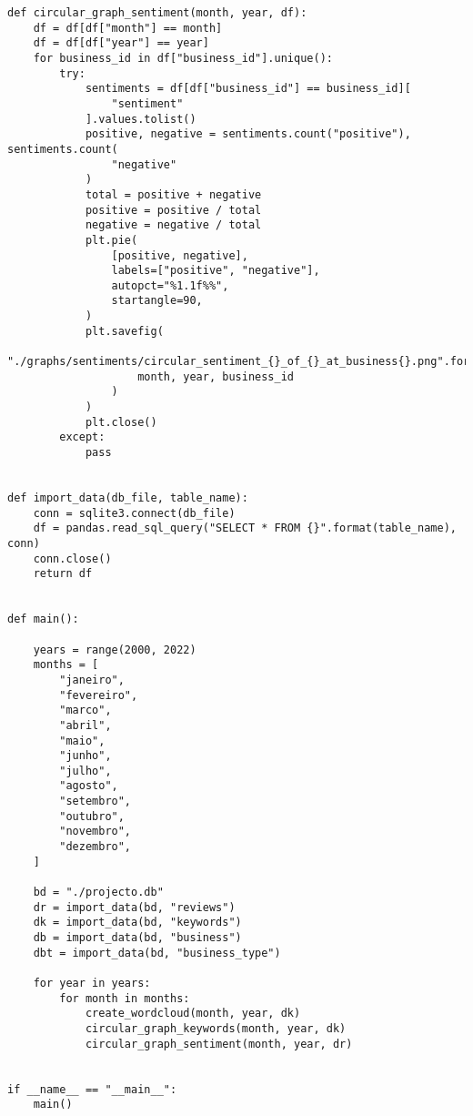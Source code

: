 \begin{verbatim}
def circular_graph_sentiment(month, year, df):
    df = df[df["month"] == month]
    df = df[df["year"] == year]
    for business_id in df["business_id"].unique():
        try:
            sentiments = df[df["business_id"] == business_id][
                "sentiment"
            ].values.tolist()
            positive, negative = sentiments.count("positive"), sentiments.count(
                "negative"
            )
            total = positive + negative
            positive = positive / total
            negative = negative / total
            plt.pie(
                [positive, negative],
                labels=["positive", "negative"],
                autopct="%1.1f%%",
                startangle=90,
            )
            plt.savefig(
                "./graphs/sentiments/circular_sentiment_{}_of_{}_at_business{}.png".format(
                    month, year, business_id
                )
            )
            plt.close()
        except:
            pass


def import_data(db_file, table_name):
    conn = sqlite3.connect(db_file)
    df = pandas.read_sql_query("SELECT * FROM {}".format(table_name), conn)
    conn.close()
    return df


def main():

    years = range(2000, 2022)
    months = [
        "janeiro",
        "fevereiro",
        "marco",
        "abril",
        "maio",
        "junho",
        "julho",
        "agosto",
        "setembro",
        "outubro",
        "novembro",
        "dezembro",
    ]

    bd = "./projecto.db"
    dr = import_data(bd, "reviews")
    dk = import_data(bd, "keywords")
    db = import_data(bd, "business")
    dbt = import_data(bd, "business_type")

    for year in years:
        for month in months:
            create_wordcloud(month, year, dk)
            circular_graph_keywords(month, year, dk)
            circular_graph_sentiment(month, year, dr)


if __name__ == "__main__":
    main()

\end{verbatim}